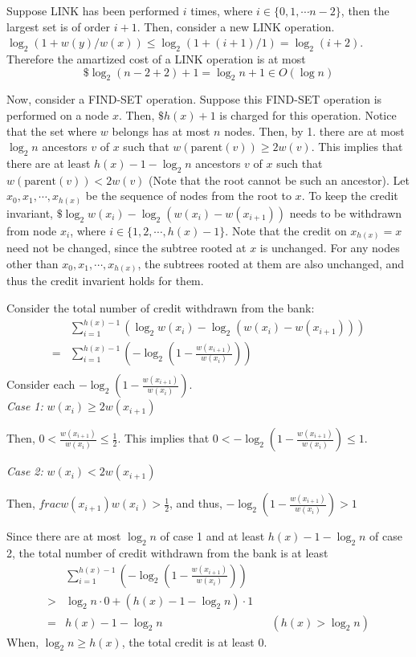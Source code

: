\documentclass[10pt]{article}
\begin{document}
\begin{enumerate}
		Suppose LINK has been performed $i$ times, where $i \in \{0, 1, \cdots
		n-2\}$, then the largest set is of order $i+1$.
		Then, consider a new LINK operation.
		$\log_2(1+w(y)/w(x)) \leq \log_2(1+(i+1)/1) = \log_2(i+2)$.
		Therefore the amartized cost of a LINK operation is at most
		$$\$\log_2(n-2+2)+1 = \log_2n+1 \in O(\log n)$$


		Now, consider a FIND-SET operation.
		Suppose this FIND-SET operation is performed on a node $x$.
		Then, $\$h(x)+1$ is charged for this operation.
		Notice that the set where $w$ belongs has at most $n$ nodes.
		Then, by 1. there are at most $\log_2n$ ancestors $v$ of $x$ such that
		$w(\text{parent}(v)) \geq 2w(v)$.
		This implies that there are at least $h(x)-1 - \log_2n$ ancestors $v$
		of $x$ such that $w(\text{parent}(v)) < 2w(v)$ (Note that the root
		cannot be such an ancestor).
		Let $x_0, x_1, \cdots, x_{h(x)}$ be the sequence of nodes from the root
		to $x$.
		To keep the credit invariant, $\$\log_2w(x_i) - \log_2(w(x_i) -
		w(x_{i+1}))$ needs to be withdrawn from node $x_i$, where $i \in \{1,
		2, \cdots, h(x)-1\}$. 
		Note that the credit on $x_{h(x)} = x$ need not be changed, since the
		subtree rooted at $x$ is unchanged.
		For any nodes other than $x_0, x_1, \cdots, x_{h(x)}$, the subtrees
		rooted at them are also unchanged, and thus the credit invarient holds
		for them.

		Consider the total number of credit withdrawn from the bank:
		\begin{align*}
			& \sum_{i=1}^{h(x)-1}(\log_2w(x_i) - \log_2(w(x_i) - w(x_{i+1}))) \\
			=& \sum_{i=1}^{h(x)-1} \left(- \log_2(1 -
			\frac{w(x_{i+1})}{w(x_i)}) \right) \\
		\end{align*}
		Consider each $- \log_2(1 - \frac{w(x_{i+1})}{w(x_i)})$. \\
		\textit{Case 1:} $w(x_{i}) \geq 2w(x_{i+1})$
		\begin{addmargin}[1em]{0em}
			Then, $0 < \frac{w(x_{i+1})}{w(x_i)} \leq \frac{1}{2}$.
			This implies that $0< -\log_2(1-\frac{w(x_{i+1})}{w(x_i)}) \leq 1$.
		\end{addmargin}
		\textit{Case 2:} $w(x_{i}) < 2w(x_{i+1})$
		\begin{addmargin}[1em]{0em}
			Then, $frac{w(x_{i+1})}{w(x_i)} > \frac{1}{2}$, and thus, $-
			\log_2(1 - \frac{w(x_{i+1})}{w(x_i)}) > 1$
		\end{addmargin}
		Since there are at most $\log_2n$ of case 1 and at least
		$h(x)-1-\log_2n$ of case 2, the total number of credit withdrawn from
		the bank is at least
		\begin{align*}
			& \sum_{i=1}^{h(x)-1} \left(- \log_2(1 - \frac{w(x_{i+1})}{w(x_i)})
			\right) \\
			>& \log_2n \cdot 0 + (h(x) - 1 - \log_2n) \cdot 1 \\
			=& h(x) - 1 - \log_2n && (h(x) > \log_2n)
		\end{align*}
		When, $\log_2n \geq h(x)$, the total credit is at least 0.


\end{enumerate}
\end{document}
